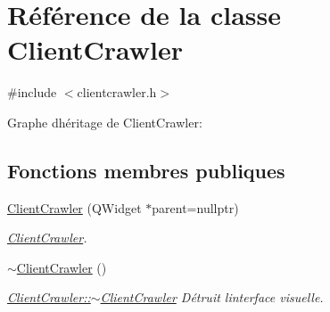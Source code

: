 \hypertarget{class_client_crawler}{}\section{Référence de la classe Client\+Crawler}
\label{class_client_crawler}


{\ttfamily \#include $<$clientcrawler.\+h$>$}



Graphe d\textquotesingle{}héritage de Client\+Crawler\+:
\subsection*{Fonctions membres publiques}
\begin{DoxyCompactItemize}
\item 
\hyperlink{class_client_crawler_a07b217751bd9e1b100330453605a8d7d}{Client\+Crawler} (Q\+Widget $\ast$parent=nullptr)
\begin{DoxyCompactList}\small\item\em \hyperlink{class_client_crawler}{Client\+Crawler}. \end{DoxyCompactList}\item 
\hyperlink{class_client_crawler_af66de2d9f7a09978c1deb87c2771df3e}{$\sim$\+Client\+Crawler} ()
\begin{DoxyCompactList}\small\item\em \hyperlink{class_client_crawler_af66de2d9f7a09978c1deb87c2771df3e}{Client\+Crawler\+::$\sim$\+Client\+Crawler} Détruit l\textquotesingle{}interface visuelle. \end{DoxyCompactList}\end{DoxyCompactItemize}
